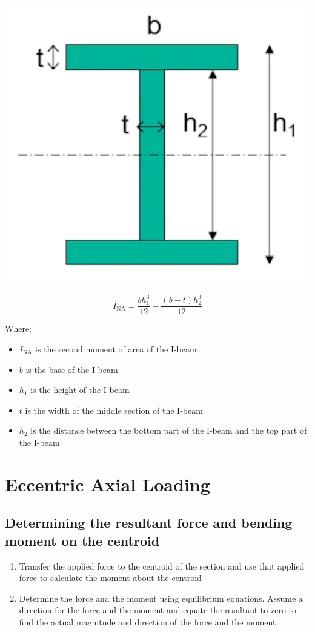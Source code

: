 \documentclass[11pt]{article}
\begin{document}
\begin{center}
\includegraphics[scale=1]{./images/i-beam-section-moment-of-inertia.png}
\end{center}

\[I_{\text{NA}} = \frac{bh_1^3}{12} - \frac{(b - t)h_2^3}{12}\]

Where:
\begin{itemize}
\item \(I_{\text{NA}}\) is the second moment of area of the I-beam
\item \(b\) is the base of the I-beam
\item \(h_1\) is the height of the I-beam
\item \(t\) is the width of the middle section of the I-beam
\item \(h_2\) is the distance between the bottom part of the I-beam and the top part of the I-beam
\end{itemize}
\section{Eccentric Axial Loading}
\label{sec:org3308be0}

\subsection{Determining the resultant force and bending moment on the centroid}
\label{sec:org684a807}
\begin{enumerate}
\item Transfer the applied force to the centroid of the section and use that applied force to calculate the moment about the centroid
\item Determine the force and the moment using equilibrium equations. Assume a direction for the force and the moment and equate the resultant to zero to find the actual magnitude and direction of the force and the moment.
\end{enumerate}
\end{document}
